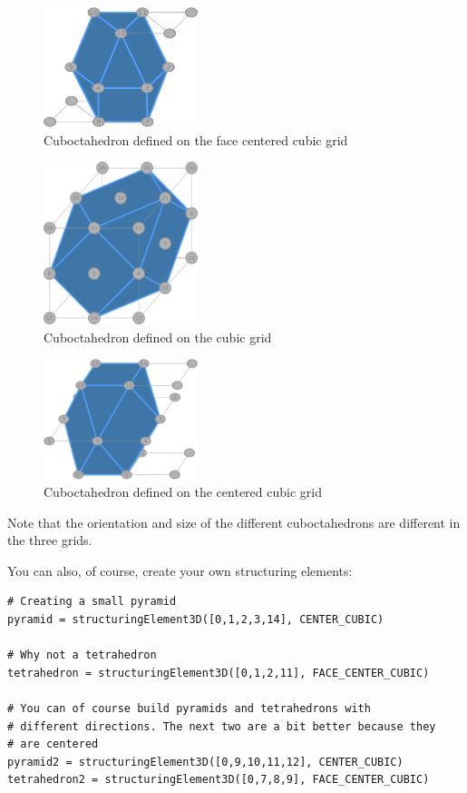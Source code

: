 \documentclass[a4paper,10pt,oneside]{article}
\begin{document}
\begin{figure}
\centering
\includegraphics[width=0.4\textwidth]{figures/Cuboc_on_fccubic.pdf}
\caption{Cuboctahedron defined on the face centered cubic grid}
\label{fig:cuboc_fcc}
\end{figure}

\begin{figure}
\centering
\includegraphics[width=0.4\textwidth]{figures/Cuboc_on_cubic.pdf}
\caption{Cuboctahedron defined on the cubic grid}
\label{fig:cuboc_c}
\end{figure}

\begin{figure}
\centering
\includegraphics[width=0.4\textwidth]{figures/Cuboc_on_ccubic.pdf}
\caption{Cuboctahedron defined on the centered cubic grid}
\label{fig:cuboc_cc}
\end{figure}

Note that the orientation and size of the different cuboctahedrons are different
in the three grids.

You can also, of course, create your own structuring elements:

\lstset{language=Python}
\begin{lstlisting}
# Creating a small pyramid
pyramid = structuringElement3D([0,1,2,3,14], CENTER_CUBIC)

# Why not a tetrahedron
tetrahedron = structuringElement3D([0,1,2,11], FACE_CENTER_CUBIC)

# You can of course build pyramids and tetrahedrons with
# different directions. The next two are a bit better because they
# are centered
pyramid2 = structuringElement3D([0,9,10,11,12], CENTER_CUBIC)
tetrahedron2 = structuringElement3D([0,7,8,9], FACE_CENTER_CUBIC)
\end{lstlisting}
\end{document}
